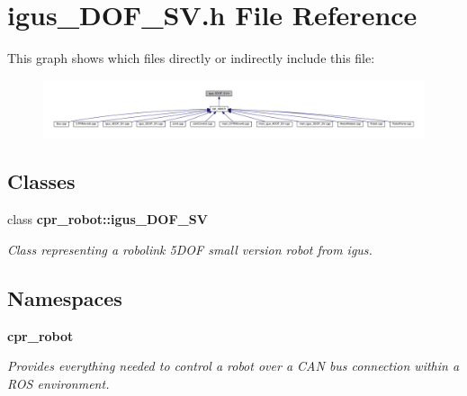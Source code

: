 \section{igus\+\_\+D\+O\+F\+\_\+\+S\+V.\+h File Reference}
\label{igus__5DOF__SV_8h}
This graph shows which files directly or indirectly include this file\+:
\nopagebreak
\begin{figure}[H]
\begin{center}
\leavevmode
\includegraphics[width=350pt]{igus__5DOF__SV_8h__dep__incl}
\end{center}
\end{figure}
\subsection*{Classes}
\begin{DoxyCompactItemize}
\item 
class \textbf{ cpr\+\_\+robot\+::igus\+\_\+D\+O\+F\+\_\+\+SV}
\begin{DoxyCompactList}\small\item\em Class representing a robolink 5\+D\+OF small version robot from igus. \end{DoxyCompactList}\end{DoxyCompactItemize}
\subsection*{Namespaces}
\begin{DoxyCompactItemize}
\item 
 \textbf{ cpr\+\_\+robot}
\begin{DoxyCompactList}\small\item\em Provides everything needed to control a robot over a C\+AN bus connection within a R\+OS environment. \end{DoxyCompactList}\end{DoxyCompactItemize}
